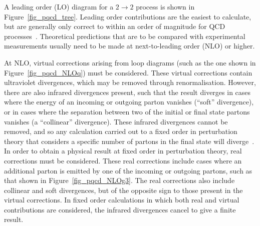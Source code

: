 A leading order (LO) diagram for a $2\rightarrow 2$ process is shown in Figure~\ref{fig_pqcd_tree}. Leading order contributions are the easiest to calculate, but are generally only correct to within an order of magnitude for QCD processes~\cite{CataniSeymour}. Theoretical predictions that are to be compared with experimental measurements usually need to be made at next-to-leading order (NLO) or higher.

At NLO, virtual corrections arising from loop diagrams (such as the one shown in Figure~\ref{fig_pqcd_NLOq}) must  be considered. These virtual corrections contain ultraviolet divergences, which may be removed through renormalisation. However, there are also infrared divergences present, such that the result diverges in cases where the energy of an incoming or outgoing parton vanishes (``soft'' divergence), or in cases where the separation between two of the initial or final state partons vanishes (a ``collinear'' divergence). These infrared divergences cannot be removed, and so any calculation carried out to a fixed order in perturbation theory that considers a specific number of partons in the final state will diverge~\cite{new_method}. In order to obtain a physical result at fixed order in perturbation theory, real corrections must be considered. These real corrections include cases where an additional parton is emitted by one of the incoming or outgoing partons, such as that shown in Figure~\ref{fig_pqcd_NLOg3}. The real corrections also include collinear and soft divergences, but of the opposite sign to those present in the virtual corrections. In fixed order calculations in which both real and virtual contributions are considered, the infrared divergences cancel to give a finite result\cite{CataniSeymour}. 
